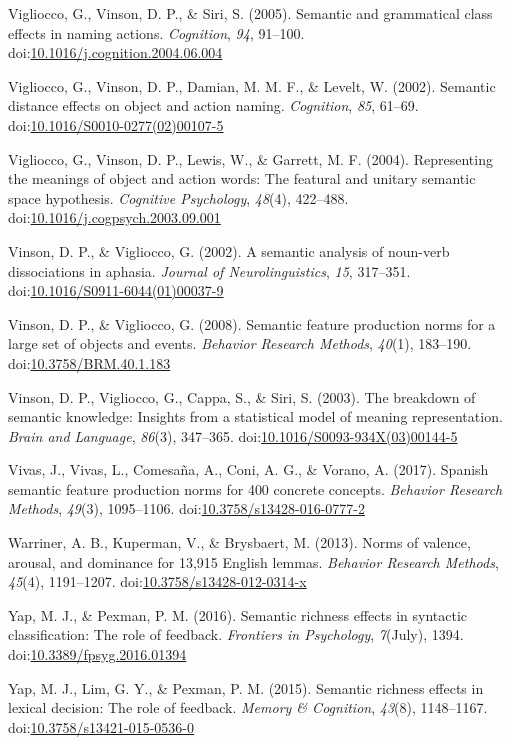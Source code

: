\documentclass[english,man]{apa6}
\theoremstyle{definition}
\theoremstyle{definition}
\theoremstyle{definition}
\theoremstyle{remark}
\begin{document}
\hypertarget{ref-Vigliocco2005}{}
Vigliocco, G., Vinson, D. P., \& Siri, S. (2005). Semantic and
grammatical class effects in naming actions. \emph{Cognition},
\emph{94}, 91--100.
doi:\href{https://doi.org/10.1016/j.cognition.2004.06.004}{10.1016/j.cognition.2004.06.004}

\hypertarget{ref-Vigliocco2002}{}
Vigliocco, G., Vinson, D. P., Damian, M. M. F., \& Levelt, W. (2002).
Semantic distance effects on object and action naming. \emph{Cognition},
\emph{85}, 61--69.
doi:\href{https://doi.org/10.1016/S0010-0277(02)00107-5}{10.1016/S0010-0277(02)00107-5}

\hypertarget{ref-Vigliocco2004}{}
Vigliocco, G., Vinson, D. P., Lewis, W., \& Garrett, M. F. (2004).
Representing the meanings of object and action words: The featural and
unitary semantic space hypothesis. \emph{Cognitive Psychology},
\emph{48}(4), 422--488.
doi:\href{https://doi.org/10.1016/j.cogpsych.2003.09.001}{10.1016/j.cogpsych.2003.09.001}

\hypertarget{ref-Vinson2002}{}
Vinson, D. P., \& Vigliocco, G. (2002). A semantic analysis of noun-verb
dissociations in aphasia. \emph{Journal of Neurolinguistics}, \emph{15},
317--351.
doi:\href{https://doi.org/10.1016/S0911-6044(01)00037-9}{10.1016/S0911-6044(01)00037-9}

\hypertarget{ref-Vinson2008}{}
Vinson, D. P., \& Vigliocco, G. (2008). Semantic feature production
norms for a large set of objects and events. \emph{Behavior Research
Methods}, \emph{40}(1), 183--190.
doi:\href{https://doi.org/10.3758/BRM.40.1.183}{10.3758/BRM.40.1.183}

\hypertarget{ref-Vinson2003}{}
Vinson, D. P., Vigliocco, G., Cappa, S., \& Siri, S. (2003). The
breakdown of semantic knowledge: Insights from a statistical model of
meaning representation. \emph{Brain and Language}, \emph{86}(3),
347--365.
doi:\href{https://doi.org/10.1016/S0093-934X(03)00144-5}{10.1016/S0093-934X(03)00144-5}

\hypertarget{ref-Vivas2017}{}
Vivas, J., Vivas, L., Comesaña, A., Coni, A. G., \& Vorano, A. (2017).
Spanish semantic feature production norms for 400 concrete concepts.
\emph{Behavior Research Methods}, \emph{49}(3), 1095--1106.
doi:\href{https://doi.org/10.3758/s13428-016-0777-2}{10.3758/s13428-016-0777-2}

\hypertarget{ref-Warriner2013}{}
Warriner, A. B., Kuperman, V., \& Brysbaert, M. (2013). Norms of
valence, arousal, and dominance for 13,915 English lemmas.
\emph{Behavior Research Methods}, \emph{45}(4), 1191--1207.
doi:\href{https://doi.org/10.3758/s13428-012-0314-x}{10.3758/s13428-012-0314-x}

\hypertarget{ref-Yap2016}{}
Yap, M. J., \& Pexman, P. M. (2016). Semantic richness effects in
syntactic classification: The role of feedback. \emph{Frontiers in
Psychology}, \emph{7}(July), 1394.
doi:\href{https://doi.org/10.3389/fpsyg.2016.01394}{10.3389/fpsyg.2016.01394}

\hypertarget{ref-Yap2015}{}
Yap, M. J., Lim, G. Y., \& Pexman, P. M. (2015). Semantic richness
effects in lexical decision: The role of feedback. \emph{Memory \&
Cognition}, \emph{43}(8), 1148--1167.
doi:\href{https://doi.org/10.3758/s13421-015-0536-0}{10.3758/s13421-015-0536-0}
\end{document}
